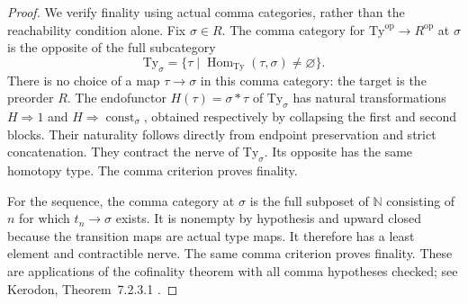\begin{proof}
We verify finality using actual comma categories, rather than the reachability condition alone. Fix $\sigma\in R$. The comma category for $\mathrm{Ty}^{\mathrm{op}}\to R^{\mathrm{op}}$ at $\sigma$ is the opposite of the full subcategory
\[
 \mathrm{Ty}_\sigma=\{\tau\mid\operatorname{Hom}_{\mathrm{Ty}}(\tau,\sigma)\ne\varnothing\}.
\]
There is no choice of a map $\tau\to\sigma$ in this comma category: the target is the preorder $R$. The endofunctor $H(\tau)=\sigma*\tau$ of $\mathrm{Ty}_\sigma$ has natural transformations $H\Rightarrow1$ and $H\Rightarrow\operatorname{const}_\sigma$, obtained respectively by collapsing the first and second blocks. Their naturality follows directly from endpoint preservation and strict concatenation. They contract the nerve of $\mathrm{Ty}_\sigma$. Its opposite has the same homotopy type. The comma criterion proves finality.

For the sequence, the comma category at $\sigma$ is the full subposet of $\mathbb N$ consisting of $n$ for which $t_n\to\sigma$ exists. It is nonempty by hypothesis and upward closed because the transition maps are actual type maps. It therefore has a least element and contractible nerve. The same comma criterion proves finality. These are applications of the cofinality theorem with all comma hypotheses checked; see Kerodon, Theorem~7.2.3.1 \citep{ALurie2026}.
\end{proof}

